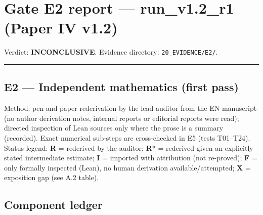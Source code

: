 \documentclass[
]{article}
\author{}
\date{}
\begin{document}
\section{Gate E2 report --- run\_v1.2\_r1 (Paper IV
v1.2)}\label{gate-e2-report--run_v12_r1-paper-iv-v12}

Verdict: \textbf{INCONCLUSIVE}. Evidence directory:
\texttt{20\_EVIDENCE/E2/}.

\begin{center}\rule{0.5\linewidth}{0.5pt}\end{center}

\subsection{E2 --- Independent mathematics (first
pass)}\label{e2--independent-mathematics-first-pass}

Method: pen-and-paper rederivation by the lead auditor from the EN
manuscript (no author derivation notes, internal reports or editorial
reports were read); directed inspection of Lean sources only where the
prose is a summary (recorded). Exact numerical sub-steps are
cross-checked in E5 (tests T01--T24). Status legend: \textbf{R} =
rederived by the auditor; \textbf{R}* = rederived given an explicitly
stated intermediate estimate; \textbf{I} = imported with attribution
(not re-proved); \textbf{F} = only formally inspected (Lean), no human
derivation available/attempted; \textbf{X} = exposition gap (see A.2
table).

\subsection{Component ledger}\label{component-ledger}
\end{document}
